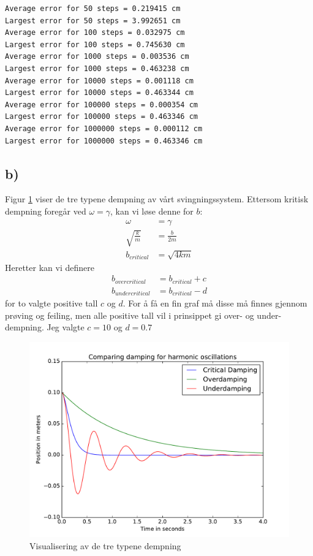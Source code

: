 \documentclass[12p,a4paper]{article}
\begin{document}
\begin{lstlisting}[basicstyle=\footnotesize,
frame = single,
label = lst:error,
caption = Error for different amount of steps of RK4]
Average error for 50 steps = 0.219415 cm
Largest error for 50 steps = 3.992651 cm
Average error for 100 steps = 0.032975 cm
Largest error for 100 steps = 0.745630 cm
Average error for 1000 steps = 0.003536 cm
Largest error for 1000 steps = 0.463238 cm
Average error for 10000 steps = 0.001118 cm
Largest error for 10000 steps = 0.463344 cm
Average error for 100000 steps = 0.000354 cm
Largest error for 100000 steps = 0.463346 cm
Average error for 1000000 steps = 0.000112 cm
Largest error for 1000000 steps = 0.463346 cm
\end{lstlisting}



\subsection*{b)}
Figur \ref{fig:dempning} viser de tre typene dempning av vårt svingningssystem. Ettersom kritisk dempning foregår ved $\omega = \gamma$, kan vi løse denne for $b$:
\begin{align*}
\omega &= \gamma \\
\sqrt{\frac{k}{m}} &= \frac{b}{2m} \\
b_{critical} &= \sqrt{4km}
\end{align*}
Heretter kan vi definere
\begin{align*}
b_{overcritical} &= b_{critical} + c \\
b_{undercritical} &= b_{critical} - d
\end{align*}
for to valgte positive tall $c$ og $d$. For å få en fin graf må disse må finnes gjennom prøving og feiling, men alle positive tall vil i prinsippet gi over- og under-dempning. Jeg valgte $c = 10$ og $d = 0.7$
\begin{figure}[H]
\includegraphics[width=\textwidth]{fig/Damping.pdf}
\caption{Visualisering av de tre typene dempning}
\label{fig:dempning}
\end{figure}
\end{document}
